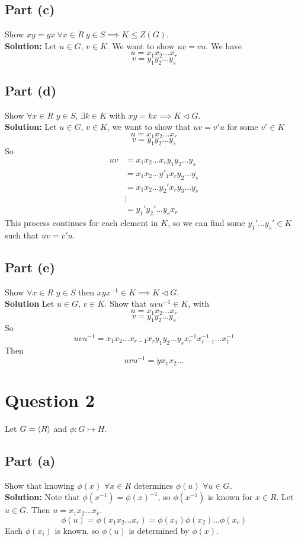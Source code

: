 \documentclass[openany]{report}
\begin{document}
\subsection{Part (c)}
Show $xy = yx \ \forall x \in R \ y\in S \implies K \leq Z(G)$.\\[2ex]
\textbf{Solution:}
Let $u \in G$, $v \in K$. We want to show $uv = vu$. 
We have 
\[u = x_1x_2 \ldots x_r\]
\[v = y_1y_2 \ldots y_s\]

\subsection{Part (d)}

Show $\forall x \in R$ $y \in S$, $\exists k \in K$ with $xy = kx \implies K \triangleleft G$. \\[2ex]
\textbf{Solution:} Let $u \in G$, $v \in K$, we want to show that $uv = v'u$ for some $v' \in K$
\[u = x_1x_2 \ldots x_r\]
\[v = y_1y_2 \ldots y_s\]
So 
\begin{align*}
    uv &= x_1x_2 \ldots x_ry_1y_2\ldots y_s  \\
    &= x_1x_2 \ldots y'_1x_ry_2 \ldots y_s \tag{some $y_1' \in K$}\\
    &= x_1x_2\ldots y_2'x_ry_3 \ldots y_s\\
    &\vdots\\
    &= y_1'y_2'\ldots y_s x_r
\end{align*}
This process continues for each element in $K$, so we can find some $y_1' \ldots y_s' \in K$ such that $uv = v'u$.
\subsection{Part (e)}
Show $\forall x \in R$ $y \in S$ then $xyx^{-1} \in K \implies K \triangleleft G$. \\[2ex]
\textbf{Solution}
Let $u \in G$, $v \in K$. Show that $uvu^{-1} \in K$, with 
\[u = x_1x_2\ldots x_r\]
\[v = y_1y_2\ldots y_s\]
So 
\[uvu^{-1} = x_1x_2\ldots x_{r-1}x_r y_1y_2\ldots y_s x_r^{-1}x_{r-1}^{-1}\ldots x_1^{-1}\]
Then 
\[uvu^{-1} = \tilde{y} x_1x_2 \ldots \]
\section{Question 2}
Let $G = \langle R \rangle$ and $\phi: G \mapsto H$. 
\subsection{Part (a)}
Show that knowing $\phi(x)$ $\forall x \in R$ determines $\phi(u)$ $\forall u \in G$. \\[2ex]
\textbf{Solution:} Note that $\phi(x^{-1}) = \phi(x)^{-1}$, so $\phi(x^{-1}) $ is known for $ x \in R$. Let $u \in G$. Then $u = x_1x_2\ldots x_r$.
\[\phi(u) = \phi(x_1x_2\ldots x_r) = \phi(x_1)\phi(x_2)\ldots\phi(x_r)\]
Each $\phi(x_i)$ is known, so $\phi(u)$ is determined by $\phi(x)$.
\end{document}
